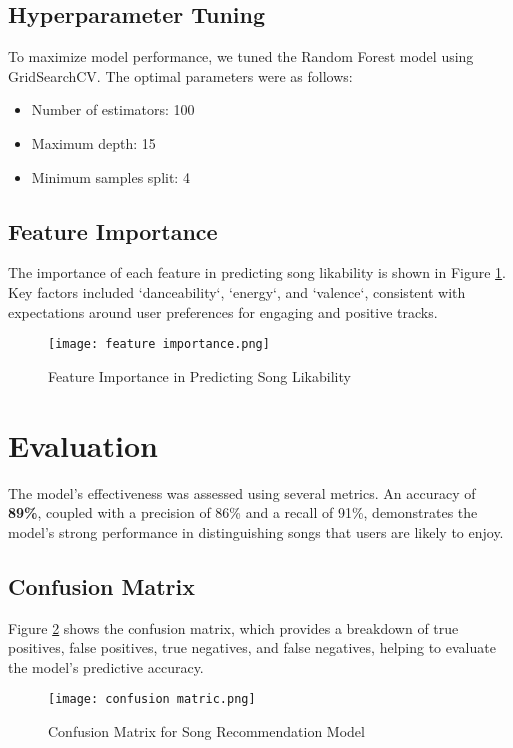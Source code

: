 \documentclass[12pt]{article}
\begin{document}
\subsection{Hyperparameter Tuning}
To maximize model performance, we tuned the Random Forest model using GridSearchCV. The optimal parameters were as follows:
\begin{itemize}
    \item Number of estimators: 100
    \item Maximum depth: 15
    \item Minimum samples split: 4
\end{itemize}

\subsection{Feature Importance}
The importance of each feature in predicting song likability is shown in Figure \ref{fig:feature_importance}. Key factors included `danceability`, `energy`, and `valence`, consistent with expectations around user preferences for engaging and positive tracks.

\begin{figure}[H]
    \centering
    \texttt{[image: feature importance.png]}
    \caption{Feature Importance in Predicting Song Likability}
    \label{fig:feature_importance}
\end{figure}

\section{Evaluation}
The model's effectiveness was assessed using several metrics. An accuracy of \textbf{89\%}, coupled with a precision of 86\% and a recall of 91\%, demonstrates the model's strong performance in distinguishing songs that users are likely to enjoy.

\subsection{Confusion Matrix}
Figure \ref{fig:confusion_matrix} shows the confusion matrix, which provides a breakdown of true positives, false positives, true negatives, and false negatives, helping to evaluate the model's predictive accuracy.

\begin{figure}[H]
    \centering
    \texttt{[image: confusion matric.png]}
    \caption{Confusion Matrix for Song Recommendation Model}
    \label{fig:confusion_matrix}
\end{figure}
\end{document}
